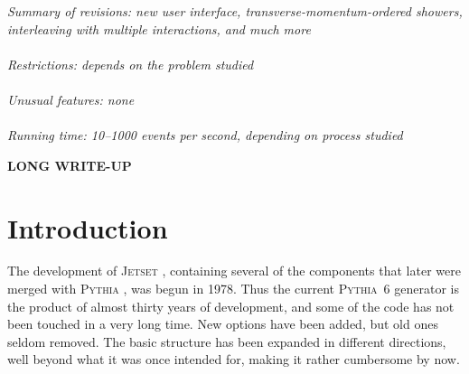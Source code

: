 \documentclass{elsartmod}
\begin{document}
\begin{small}
{\em Summary of revisions: new user interface, 
transverse-momentum-ordered showers, interleaving with multiple 
interactions, and much more}\\
   \\
{\em Restrictions: depends on the problem studied}\\
   \\
{\em Unusual features: none}\\
   \\
{\em Running time: 10--1000 events per second, depending on
process studied}\\

\end{small}
\clearpage


\hspace{1pc}
{\bf LONG WRITE-UP}

\section{Introduction}

The development of \textsc{Jetset} \cite{jetset}, containing several 
of the components that later were merged with \textsc{Pythia}
\cite{pythiaearly}, was begun in 1978. Thus the current 
\textsc{Pythia}~6 generator \cite{pythiasixone, pythiasixfour} 
is the product of almost thirty years of development, 
and some of the code has not been touched in a very long time. New 
options have been added, but old ones seldom removed. The basic 
structure has been expanded in different directions, well beyond 
what it was once intended for, making it rather cumbersome by now.
\end{document}
